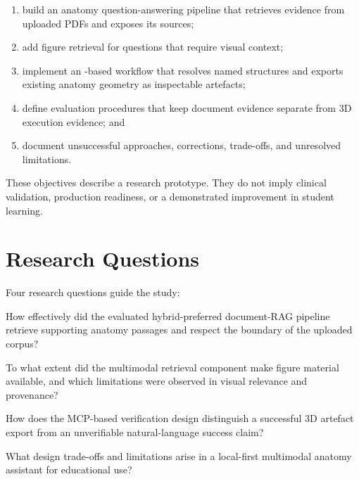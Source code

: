 \begin{enumerate}[label=\textbf{O\arabic*.},leftmargin=*,itemsep=0.25em,topsep=0.35em]
  \item build an anatomy question-answering pipeline that retrieves evidence from uploaded PDFs and exposes its sources;
  \item add figure retrieval for questions that require visual context;
  \item implement an \MCP{}-based workflow that resolves named structures and exports existing anatomy geometry as inspectable artefacts;
  \item define evaluation procedures that keep document evidence separate from 3D execution evidence; and
  \item document unsuccessful approaches, corrections, trade-offs, and unresolved limitations.
\end{enumerate}

These objectives describe a research prototype. They do not imply clinical validation, production readiness, or a demonstrated improvement in student learning.

\section{Research Questions}
\label{sec:introduction-research-questions}

Four research questions guide the study:

\begin{description}[style=nextline,leftmargin=2.2cm,labelwidth=1.6cm,itemsep=0.35em,topsep=0.35em]
  \item[\textbf{RQ1}] How effectively did the evaluated hybrid-preferred document-RAG pipeline retrieve supporting anatomy passages and respect the boundary of the uploaded corpus?

  \item[\textbf{RQ2}] To what extent did the multimodal retrieval component make figure material available, and which limitations were observed in visual relevance and provenance?

  \item[\textbf{RQ3}] How does the MCP-based verification design distinguish a successful 3D artefact export from an unverifiable natural-language success claim?

  \item[\textbf{RQ4}] What design trade-offs and limitations arise in a local-first multimodal anatomy assistant for educational use?
\end{description}

